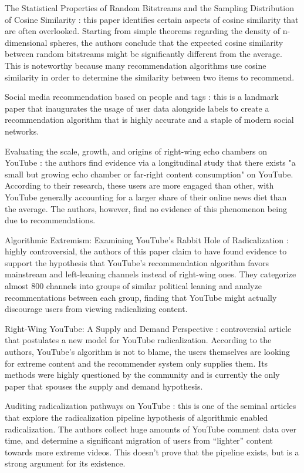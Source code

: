 The Statistical Properties of Random Bitstreams and the Sampling Distribution of
Cosine Similarity \citet{giller_statistical_2012}: this paper identifies certain
aspects of cosine similarity that are often overlooked. Starting from simple
theorems regarding the density of n-dimensional spheres, the authors conclude
that the expected cosine similarity between random bitstreams might be
significantly different from the average. This is noteworthy because many
recommendation algorithms use cosine similarity in order to determine the
similarity between two items to recommend.

Social media recommendation based on people and tags \citet{guy_social_2010}:
this is a landmark paper that inaugurates the usage of user data alongside
labels to create a recommendation algorithm that is highly accurate and a staple
of modern social networks.

Evaluating the scale, growth, and origins of right-wing echo chambers on YouTube
\citet{hosseinmardi_evaluating_2020}: the authors find evidence via a
longitudinal study that there exists "a small but growing echo chamber or
far-right content consumption" on YouTube. According to their research, these
users are more engaged than other, with YouTube generally accounting for a
larger share of their online news diet than the average. The authors, however,
find no evidence of this phenomenon being due to recommendations.

Algorithmic Extremism: Examining YouTube's Rabbit Hole of Radicalization
\citet{ledwich_algorithmic_2019}: highly controversial, the authors of this
paper claim to have found evidence to support the hypothesis that YouTube's
recommendation algorithm favors mainstream and left-leaning channels instead of
right-wing ones. They categorize almost 800 channels into groups of similar
political leaning and analyze recommentations between each group, finding that
YouTube might actually discourage users from viewing radicalizing content.

Right-Wing YouTube: A Supply and Demand Perspective
\citet{munger_right-wing_2020}: controversial article that postulates a new
model for YouTube radicalization. According to the authors, YouTube's algorithm
is not to blame, the users themselves are looking for extreme content and the
recommender system only supplies them. Its methods were highly questioned by the
community and is currently the only paper that spouses the supply and demand
hypothesis.

Auditing radicalization pathways on YouTube \citet{ribeiro_auditing_2020}: this
is one of the seminal articles that explore the radicalization pipeline
hypothesis of algorithmic enabled radicalization. The authors collect huge
amounts of YouTube comment data over time, and determine a significant migration
of users from ``lighter'' content towards more extreme videos. This doesn't
prove that the pipeline exists, but is a strong argument for its existence.

